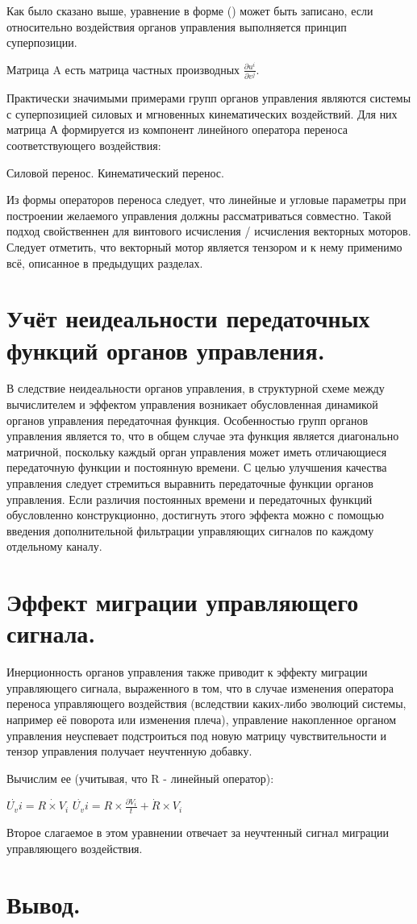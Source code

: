 \documentclass[a4paper]{article}
\begin{document}
Как было сказано выше, уравнение в форме () может быть записано, если относительно воздействия органов управления выполняется принцип суперпозиции. 

Матрица A есть матрица частных производных $\frac{\partial{u^i}}{\partial{v^j}}$.

Практически значимыми примерами групп органов управления являются системы с суперпозицией силовых и мгновенных кинематических воздействий. Для них матрица А формируется из компонент линейного оператора переноса соответствующего воздействия:

Силовой перенос.
Кинематический перенос.

Из формы операторов переноса следует, что линейные и угловые параметры при построении желаемого управления должны рассматриваться совместно. Такой подход свойственнен для винтового исчисления / исчисления векторных моторов. Следует отметить, что векторный мотор является тензором и к нему применимо всё, описанное в предыдущих разделах.  

\section{Учёт неидеальности передаточных функций органов управления.}
В следствие неидеальности органов управления, в структурной схеме между вычислителем и эффектом управления возникает обусловленная динамикой органов управления передаточная функция. Особенностью групп органов управления является то, что в общем случае эта функция является диагонально матричной, поскольку каждый орган управления может иметь отличающиеся передаточную функции и постоянную времени. С целью улучшения качества управления следует стремиться выравнить передаточные функции органов управления. Если различия постоянных времени и передаточных функций обусловленно конструкционно, достигнуть этого эффекта можно с помощью введения дополнительной фильтрации управляющих сигналов по каждому отдельному каналу.

\section{Эффект миграции управляющего сигнала.}
Инерционность органов управления также приводит к эффекту миграции управляющего сигнала, выраженного в том, что в случае изменения оператора переноса управляющего воздействия (вследствии каких-либо эволюций системы, например её поворота или изменения плеча), управление накопленное органом управления неуспевает подстроиться под новую матрицу чувствительности и тензор управления получает неучтенную добавку.

Вычислим ее (учитывая, что R - линейный оператор):

$\dot{U_vi} = \dot{R\times V_i}$
$\dot{U_vi} = R \times \frac{\partial{V_i}}{t} + \dot{R} \times V_i$

Второе слагаемое в этом уравнении отвечает за неучтенный сигнал миграции управляющего воздействия.  

\section{Вывод.}
\end{document}
